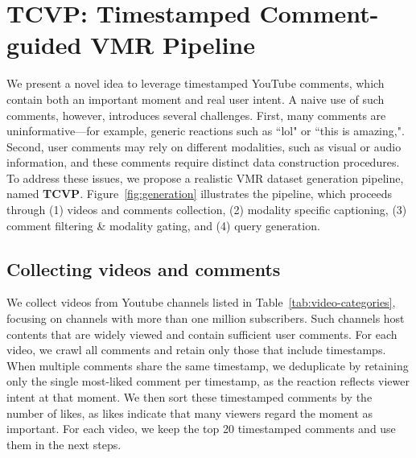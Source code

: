 \documentclass[11pt]{article}
\newcommand{\figref}[1]{Figure~\ref{#1}}
\begin{document}
\vspace{+2em}
\section{TCVP: Timestamped Comment-guided VMR Pipeline} 
We present a novel idea to leverage timestamped YouTube comments, which contain both an important moment and real user intent.
A naive use of such comments, however, introduces several challenges. First, many comments are uninformative—for example, generic reactions such as ``lol" or ``this is amazing,".
Second, user comments may rely on different modalities, such as visual or audio information, and these comments require distinct data construction procedures.
To address these issues, we propose a realistic VMR dataset generation pipeline, named \textbf{TCVP}.
\figref{fig:generation} illustrates the pipeline, which proceeds through (1) videos and comments collection, (2) modality specific captioning, (3) comment filtering \& modality gating, and (4) query generation.

\vspace{+1.em}
\subsection{Collecting videos and comments}

\vspace{+.5em}
We collect videos from Youtube channels listed in Table~\ref{tab:video-categories}, focusing on channels with more than one million subscribers. Such channels host contents that are widely viewed and contain sufficient user comments. For each video, we crawl all comments and retain only those that include timestamps. When multiple comments share the same timestamp, we deduplicate by retaining only the single most-liked comment per timestamp, as the reaction reflects viewer intent at that moment. We then sort these timestamped comments by the number of likes, as likes indicate that many viewers regard the moment as important. For each video, we keep the top 20 timestamped comments and use them in the next steps.

\end{document}
